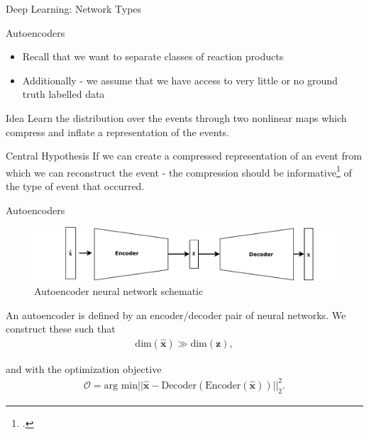 \documentclass{beamer}
\begin{document}
\begin{frame}[t]{Deep Learning: Network Types}
	\begin{figure}[h]
		\centering
	\end{figure}
\end{frame}
\begin{frame}[t]{Autoencoders}
	\begin{itemize}
		\item Recall that we want to separate classes of reaction products
		\item Additionally - we assume that we have access to very little or no ground truth labelled data
	\end{itemize}
	\begin{block}{ Idea }
		Learn the distribution over the events through two nonlinear maps which compress and inflate a representation of the events.
	\end{block}
	\begin{block}{Central Hypothesis}
		If we can create a compressed representation of an event from which we can reconstruct the event - the compression should be informative\footcite{Fertig} of the type of event that occurred.
	\end{block}
\end{frame}

\begin{frame}[t]{Autoencoders}
	\begin{figure}[h]
		\centering
		\includegraphics[width=0.8\linewidth]{../chapters/theory/autoencoder/plots/autoencoder.pdf}
		\caption{Autoencoder neural network schematic}%
		\label{fig:autoenc}
	\end{figure}

	An autoencoder is defined by an encoder/decoder pair of neural networks. We construct these such that 
	\begin{align}
		\text{dim}(\mathbf{\hat{x}}) \gg \text{dim}(\mathbf{z}),
	\end{align}

	and with the optimization objective
	\begin{align}
		\mathcal{O} = \text{arg min} || \mathbf{\hat{x}} - \text{Decoder}(\text{Encoder}(\mathbf{\hat{x}}))||_2 ^2.
	\end{align}
\end{frame}
\end{document}
